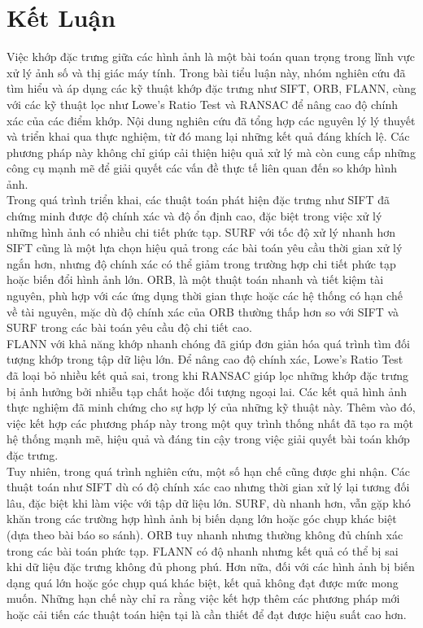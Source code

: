 \newpage
\section{Kết Luận}

Việc khớp đặc trưng giữa các hình ảnh là một bài toán quan trọng trong lĩnh vực xử lý ảnh số và thị giác máy tính. Trong bài tiểu luận này, nhóm nghiên cứu đã tìm hiểu và áp dụng các kỹ thuật khớp đặc trưng như SIFT, ORB, FLANN, cùng với các kỹ thuật lọc như Lowe’s Ratio Test và RANSAC để nâng cao độ chính xác của các điểm khớp. Nội dung nghiên cứu đã tổng hợp các nguyên lý lý thuyết và triển khai qua thực nghiệm, từ đó mang lại những kết quả đáng khích lệ. Các phương pháp này không chỉ giúp cải thiện hiệu quả xử lý mà còn cung cấp những công cụ mạnh mẽ để giải quyết các vấn đề thực tế liên quan đến so khớp hình ảnh.\\

Trong quá trình triển khai, các thuật toán phát hiện đặc trưng như SIFT đã chứng minh được độ chính xác và độ ổn định cao, đặc biệt trong việc xử lý những hình ảnh có nhiều chi tiết phức tạp. SURF với tốc độ xử lý nhanh hơn SIFT cũng là một lựa chọn hiệu quả trong các bài toán yêu cầu thời gian xử lý ngắn hơn, nhưng độ chính xác có thể giảm trong trường hợp chi tiết phức tạp hoặc biến đổi hình ảnh lớn. ORB, là một thuật toán nhanh và tiết kiệm tài nguyên, phù hợp với các ứng dụng thời gian thực hoặc các hệ thống có hạn chế về tài nguyên, mặc dù độ chính xác của ORB thường thấp hơn so với SIFT và SURF trong các bài toán yêu cầu độ chi tiết cao.\\

FLANN với khả năng khớp nhanh chóng đã giúp đơn giản hóa quá trình tìm đối tượng khớp trong tập dữ liệu lớn. Để nâng cao độ chính xác, Lowe's Ratio Test đã loại bỏ nhiều kết quả sai, trong khi RANSAC giúp lọc những khớp đặc trưng bị ảnh hưởng bởi nhiễu tạp chất hoặc đối tượng ngoại lai. Các kết quả hình ảnh thực nghiệm đã minh chứng cho sự hợp lý của những kỹ thuật này. Thêm vào đó, việc kết hợp các phương pháp này trong một quy trình thống nhất đã tạo ra một hệ thống mạnh mẽ, hiệu quả và đáng tin cậy trong việc giải quyết bài toán khớp đặc trưng.\\

Tuy nhiên, trong quá trình nghiên cứu, một số hạn chế cũng được ghi nhận. Các thuật toán như SIFT dù có độ chính xác cao nhưng thời gian xử lý lại tương đối lâu, đặc biệt khi làm việc với tập dữ liệu lớn. SURF, dù nhanh hơn, vẫn gặp khó khăn trong các trường hợp hình ảnh bị biến dạng lớn hoặc góc chụp khác biệt (dựa theo bài báo so sánh). ORB tuy nhanh nhưng thường không đủ chính xác trong các bài toán phức tạp. FLANN có độ nhanh nhưng kết quả có thể bị sai khi dữ liệu đặc trưng không đủ phong phú. Hơn nữa, đối với các hình ảnh bị biến dạng quá lớn hoặc góc chụp quá khác biệt, kết quả không đạt được mức mong muốn. Những hạn chế này chỉ ra rằng việc kết hợp thêm các phương pháp mới hoặc cải tiến các thuật toán hiện tại là cần thiết để đạt được hiệu suất cao hơn.\\


